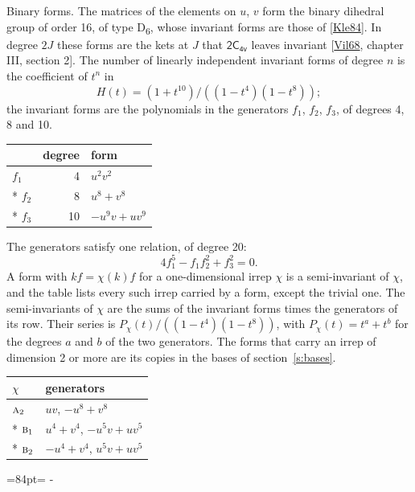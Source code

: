 \documentclass[10pt,a4paper]{article}
\makeatletter
\renewcommand\paragraph{\@startsection{paragraph}{4}{\z@}{1.5ex plus .5ex minus .2ex}{-1em}%
  {\normalfont\small\sffamily\bfseries\color{parttitle}}}
\newcommand{\needspace}[1]{\par\penalty-100\begingroup\dimen0=#1\relax\dimen2=\pagegoal
  \advance\dimen2-\pagetotal\ifdim\dimen0>\dimen2\relax\ifdim\dimen2>0pt\vfil\break\fi\fi
  \endgroup}
\numberwithin{equation}{section}
\newcommand{\grp}[1]{\mathsf{#1}}
\newcommand{\irr}[1]{\text{\normalfont\scshape #1}}
\makeatother
\begin{document}
\paragraph{Binary forms.}
The matrices of the elements on $u$, $v$ form the binary dihedral group of order 16, of type D\textsubscript{6}, whose invariant forms are those of [\href{../../../REFERENCES.pdf\#ref.Kle84}{Kle84}]. In degree $2J$ these forms are the kets at $J$ that $\grp{2C_{4v}}$ leaves invariant [\href{../../../REFERENCES.pdf\#ref.Vil68}{Vil68}, chapter III, section 2]. \label{n:head.degree}\label{n:head.form}The number of linearly independent invariant forms of degree $n$ is the coefficient of $t^n$ in
\begin{equation}\label{e:molien}H(t) = (1 + t^{10})/((1-t^{4})(1-t^{8}));\end{equation}
the invariant forms are the polynomials in the generators $f_1$, $f_2$, $f_3$, of degrees 4, 8 and 10.
{\small\begin{longtable}{@{}lrl@{}}\toprule
& degree & form\\\midrule\endhead
\bottomrule\endfoot\endlastfoot
$f_{1}$ & 4 & $u^{2}v^{2}$\\*
$f_{2}$ & 8 & $u^{8} + v^{8}$\\*
$f_{3}$ & 10 & $-u^{9}v + uv^{9}$\\
\bottomrule\end{longtable}}
The generators satisfy one relation, of degree 20:
\begin{equation}\label{e:relation}4f_{1}^{5} - f_{1}f_{2}^{2} + f_{3}^{2} = 0.\end{equation}
A form with $k f = \chi(k) f$ for a one-dimensional irrep $\chi$ is a semi-invariant of $\chi$, and the table lists every such irrep carried by a form, except the trivial one. \label{n:head.generators}The semi-invariants of $\chi$ are the sums of the invariant forms times the generators of its row. Their series is $P_\chi(t)/((1-t^{4})(1-t^{8}))$, with $P_\chi(t) = t^{a} + t^{b}$ for the degrees $a$ and $b$ of the two generators. The forms that carry an irrep of dimension 2 or more are its copies in the bases of section~\ref{s:bases}.
{\small\begin{longtable}{@{}ll@{}}\toprule
$\chi$ & generators\\\midrule\endhead
\bottomrule\endfoot\endlastfoot
$\irr{a}_{2}$ & $uv$, $-u^{8} + v^{8}$\\*
$\irr{b}_{1}$ & $u^{4} + v^{4}$, $-u^{5}v + uv^{5}$\\*
$\irr{b}_{2}$ & $-u^{4} + v^{4}$, $u^{5}v + uv^{5}$\\
\bottomrule\end{longtable}}
\needspace{84pt}
\end{document}
